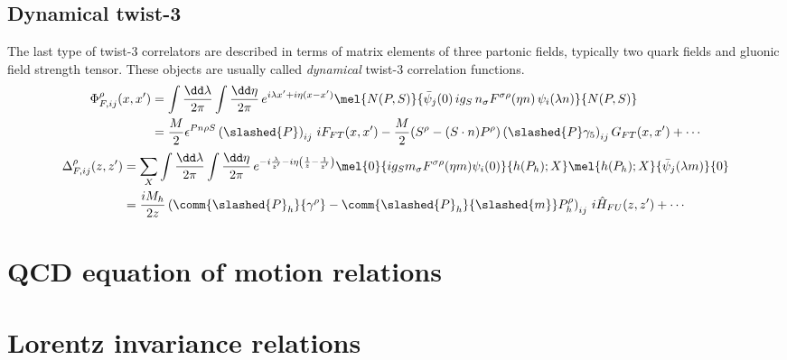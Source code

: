 \subsection{Dynamical twist-3}
The last type of twist-3 correlators are described in terms of matrix elements of three partonic fields, typically two quark fields and gluonic field strength tensor. These objects are usually called \textit{dynamical} twist-3 correlation functions.
\begin{equation}
    \begin{aligned}
        \Phi^\rho_{F,ij}(x,x')&= \int\frac{\dd \lambda}{2\pi}\int\frac{\dd \eta}{2\pi} \,e^{i\lambda x'+i\eta(x-x')}\mel{N(P,S)}{\bar \psi_j(0)\,i g_S\, n_\sigma F^{\sigma \rho}(\eta n)\, \psi_i(\lambda n)}{N(P,S)}\\
        &= \frac{M}{2}\epsilon^{Pn\rho S}\left(\slashed{P }\right)_{ij}\,i F_{FT}(x,x')-\frac{M}{2}(S^\rho-(S \cdot n)P^\rho)\left(\slashed{P }\gamma_5\right)_{ij}G_{FT}(x,x')+\cdots
    \end{aligned}
\end{equation}
\begin{equation}
    \begin{aligned}
        \Delta^\rho_{F,ij}(z,z')&= \sum_X\int\frac{\dd \lambda}{2\pi}\int\frac{\dd \eta}{2\pi} \,e^{-i\frac{\lambda}{z'}-i\eta\left(\frac{1}{z}-\frac{1}{z'}\right)}\mel{0}{ig_S m_\sigma F^{\sigma \rho}(\eta m)\psi_i(0)}{h(P_h);X}\mel{h(P_h);X}{\bar \psi_j(\lambda m)}{0}\\
        &= \frac{iM_h}{2z}\left(\comm{\slashed{P}_h}{\gamma^\rho}-\comm{\slashed{P}_h}{\slashed{m}}P_h^\rho\right)_{ij}\,i\hat H_{FU}(z,z')+\cdots
        \end{aligned}
\end{equation}
\section{QCD equation of motion relations}

\section{Lorentz invariance relations}
